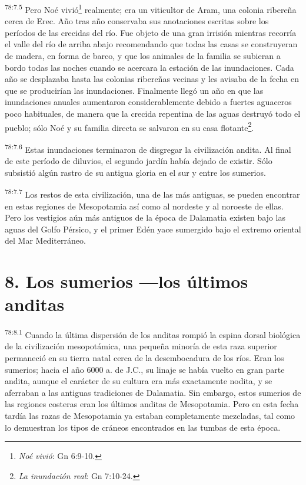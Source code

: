 \par
\textsuperscript{78:7.5} Pero Noé vivió\footnote{\textit{Noé vivió}: Gn 6:9-10.} realmente; era un viticultor de Aram, una colonia ribereña cerca de Erec. Año tras año conservaba sus anotaciones escritas sobre los períodos de las crecidas del río. Fue objeto de una gran irrisión mientras recorría el valle del río de arriba abajo recomendando que todas las casas se construyeran de madera, en forma de barco, y que los animales de la familia se subieran a bordo todas las noches cuando se acercara la estación de las inundaciones. Cada año se desplazaba hasta las colonias ribereñas vecinas y les avisaba de la fecha en que se producirían las inundaciones. Finalmente llegó un año en que las inundaciones anuales aumentaron considerablemente debido a fuertes aguaceros poco habituales, de manera que la crecida repentina de las aguas destruyó todo el pueblo; sólo Noé y su familia directa se salvaron en su casa flotante\footnote{\textit{La inundación real}: Gn 7:10-24.}.

\par
\textsuperscript{78:7.6} Estas inundaciones terminaron de disgregar la civilización andita. Al final de este período de diluvios, el segundo jardín había dejado de existir. Sólo subsistió algún rastro de su antigua gloria en el sur y entre los sumerios.

\par
\textsuperscript{78:7.7} Los restos de esta civilización, una de las más antiguas, se pueden encontrar en estas regiones de Mesopotamia así como al nordeste y al noroeste de ellas. Pero los vestigios aún más antiguos de la época de Dalamatia existen bajo las aguas del Golfo Pérsico, y el primer Edén yace sumergido bajo el extremo oriental del Mar Mediterráneo.

\section*{8. Los sumerios ---los últimos anditas}
\par
\textsuperscript{78:8.1} Cuando la última dispersión de los anditas rompió la espina dorsal biológica de la civilización mesopotámica, una pequeña minoría de esta raza superior permaneció en su tierra natal cerca de la desembocadura de los ríos. Eran los sumerios; hacia el año 6000 a. de J.C., su linaje se había vuelto en gran parte andita, aunque el carácter de su cultura era más exactamente nodita, y se aferraban a las antiguas tradiciones de Dalamatia. Sin embargo, estos sumerios de las regiones costeras eran los últimos anditas de Mesopotamia. Pero en esta fecha tardía las razas de Mesopotamia ya estaban completamente mezcladas, tal como lo demuestran los tipos de cráneos encontrados en las tumbas de esta época.

